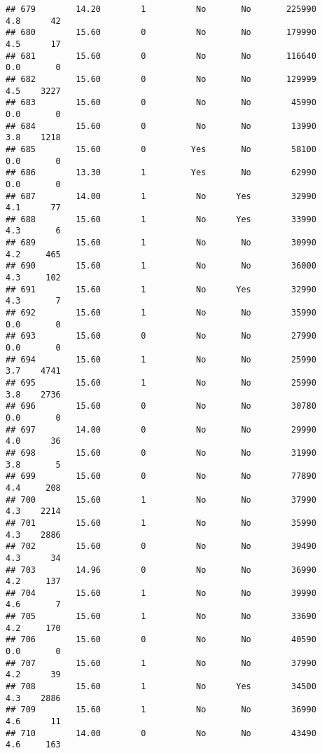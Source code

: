 \documentclass[
]{article}
\begin{document}
\begin{verbatim}
## 679        14.20        1          No       No       225990         4.8      42
## 680        15.60        0          No       No       179990         4.5      17
## 681        15.60        0          No       No       116640         0.0       0
## 682        15.60        0          No       No       129999         4.5    3227
## 683        15.60        0          No       No        45990         0.0       0
## 684        15.60        0          No       No        13990         3.8    1218
## 685        15.60        0         Yes       No        58100         0.0       0
## 686        13.30        1         Yes       No        62990         0.0       0
## 687        14.00        1          No      Yes        32990         4.1      77
## 688        15.60        1          No      Yes        33990         4.3       6
## 689        15.60        1          No       No        30990         4.2     465
## 690        15.60        1          No       No        36000         4.3     102
## 691        15.60        1          No      Yes        32990         4.3       7
## 692        15.60        1          No       No        35990         0.0       0
## 693        15.60        0          No       No        27990         0.0       0
## 694        15.60        1          No       No        25990         3.7    4741
## 695        15.60        1          No       No        25990         3.8    2736
## 696        15.60        0          No       No        30780         0.0       0
## 697        14.00        0          No       No        29990         4.0      36
## 698        15.60        0          No       No        31990         3.8       5
## 699        15.60        0          No       No        77890         4.4     208
## 700        15.60        1          No       No        37990         4.3    2214
## 701        15.60        1          No       No        35990         4.3    2886
## 702        15.60        0          No       No        39490         4.3      34
## 703        14.96        0          No       No        36990         4.2     137
## 704        15.60        1          No       No        39990         4.6       7
## 705        15.60        1          No       No        33690         4.2     170
## 706        15.60        0          No       No        40590         0.0       0
## 707        15.60        1          No       No        37990         4.2      39
## 708        15.60        1          No      Yes        34500         4.3    2886
## 709        15.60        1          No       No        36990         4.6      11
## 710        14.00        0          No       No        43490         4.6     163

\end{verbatim}
\end{document}
